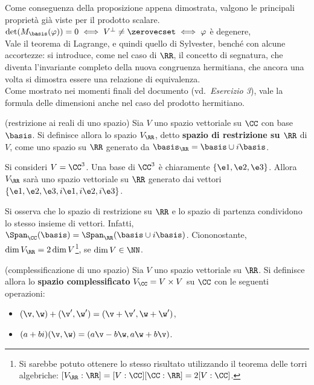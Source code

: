 \begin{remark}
	Come conseguenza della proposizione appena dimostrata, valgono
	le principali proprietà già viste per il prodotto scalare. \\
	
	\li $\det(M_\basis(\varphi)) = 0 \iff V^\perp \neq \zerovecset \iff \varphi$ è degenere, \\
	\li Vale il teorema di Lagrange, e quindi quello di Sylvester, benché con alcune accortezze: si
	introduce, come nel caso di $\RR$, il concetto di segnatura, che diventa l'invariante completo
	della nuova congruenza hermitiana, che ancora una volta si dimostra essere una relazione
	di equivalenza. \\
	\li Come mostrato nei momenti finali del documento (vd.~\textit{Esercizio 3}), vale
	la formula delle dimensioni anche nel caso del prodotto hermitiano.
\end{remark}

\hr

\begin{definition} (restrizione ai reali di uno spazio) Sia $V$
	uno spazio vettoriale su $\CC$ con base $\basis$. Si definisce allora lo spazio $V_\RR$, detto
	\textbf{spazio di restrizione su $\RR$} di $V$, come uno spazio su $\RR$ generato da
	$\basis_\RR = \basis \cup i \basis$. 
\end{definition}

\begin{example}
	Si consideri $V = \CC^3$. Una base di $\CC^3$ è chiaramente $\{ \e1, \e2, \e3 \}$. Allora
	$V_\RR$ sarà uno spazio vettoriale su $\RR$ generato dai vettori $\{ \e1, \e2, \e3, i\e1, i\e2, i\e3 \}$.
\end{example}

\begin{remark}
	Si osserva che lo spazio di restrizione su $\RR$ e lo spazio di partenza condividono lo stesso insieme
	di vettori. Infatti, $\Span_\CC(\basis) = \Span_\RR(\basis \cup i\basis)$. Ciononostante, $\dim V_\RR = 2 \dim V$\footnote{Si sarebbe potuto ottenere lo stesso risultato utilizzando il teorema delle torri algebriche: $[V_\RR : \RR] = [V: \CC] [\CC: \RR] = 2 [V : \CC]$.}, se $\dim V \in \NN$.
\end{remark}

\begin{definition} (complessificazione di uno spazio) Sia $V$ uno spazio vettoriale su $\RR$.
	Si definisce allora lo \textbf{spazio complessificato} $V_\CC = V \times V$ su $\CC$ con le seguenti operazioni:
	
	\begin{itemize}
		\item $(\v, \w) + (\v', \w') = (\v + \v', \w + \w')$,
		\item $(a+bi)(\v, \w) = (a\v - b\w, a\w + b\v)$.
	\end{itemize}
\end{definition}

